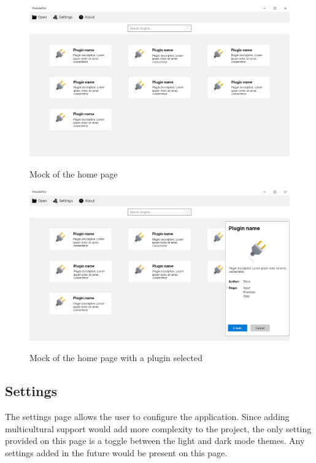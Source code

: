 \begin{figure}[H]
    \includegraphics[width=\linewidth]{img/mockHome.png}
    \label{fig:homePage}
    \caption{Mock of the home page}
\end{figure}

\begin{figure}[H]
    \includegraphics[width=\linewidth]{img/mockHome-PluginSelected.png}
    \label{fig:homePagePluginSelected}
    \caption{Mock of the home page with a plugin selected}
\end{figure}

\subsection{Settings}

The settings page allows the user to configure the application. Since adding multicultural support would add more complexity to the project, the only setting provided on this page is a toggle between the light and dark mode themes. Any settings added in the future would be present on this page.


